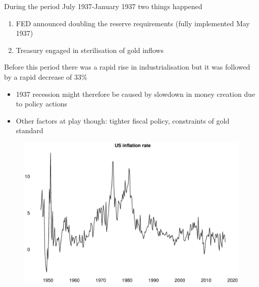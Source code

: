 \documentclass{beamer}
\begin{document}
\begin{frame}
 During the period July 1937-January 1937 two things happened
 \medskip
 \begin{enumerate}
   \item FED announced doubling the reserve requirements (fully implemented May 1937)
   \item Treasury engaged in sterilisation of gold inflows
 \end{enumerate}
 \medskip
 Before this period there was a rapid rise in industrialisation but it was followed by a rapid decrease of 33\%
 \begin{itemize}
   \item 1937 recession might therefore be caused by slowdown in money creation due to policy actions
   \item Other factors at play though: tighter fiscal policy, constraints of gold standard
 \end{itemize}  
\end{frame}


\begin{frame}
  \begin{figure}
    \includegraphics[scale=.3]{inflation.eps}
  \end{figure}
\end{frame}
\end{document}
